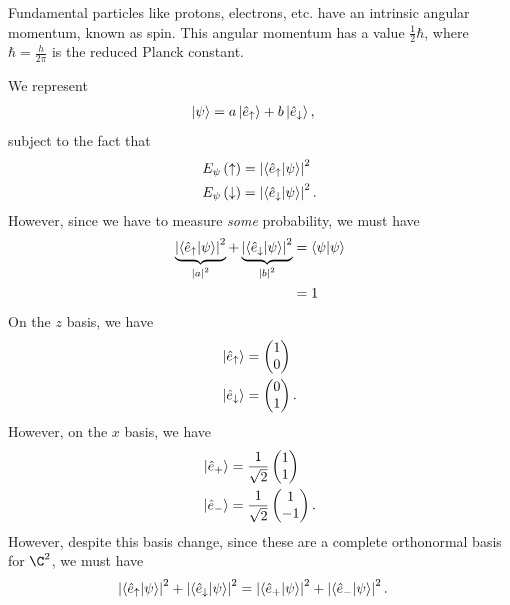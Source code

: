 \documentclass[10pt]{mypackage}
\begin{document}
\begin{example}
  Fundamental particles like protons, electrons, etc. have an intrinsic angular momentum, known as spin. This angular momentum has a value $\frac{1}{2}\hbar$, where $\hbar = \frac{h}{2\pi}$ is the reduced Planck constant.\newline

  We represent
  \begin{align*}
    \ket{\psi} &= a\ket{\hat{e}_{\uparrow}} + b\ket{\hat{e}_{\downarrow}},
  \end{align*}
  subject to the fact that
  \begin{align*}
    E_{\psi}\left(\uparrow\right) &= \left\vert \braket{\hat{e}_{\uparrow}}{\psi} \right\vert^2\\
    E_{\psi}\left(\downarrow\right) &= \left\vert \braket{\hat{e}_{\downarrow}}{\psi} \right\vert^2.
  \end{align*}
  However, since we have to measure \textit{some} probability, we must have
  \begin{align*}
    \underbrace{\left\vert \braket{\hat{e}_{\uparrow}}{\psi} \right\vert^2}_{\left\vert a \right\vert^2} + \underbrace{\left\vert \braket{\hat{e}_{\downarrow}}{\psi} \right\vert^2}_{\left\vert b \right\vert^2} &= \braket{\psi}{\psi}\\
                                                                                                                              &= 1
  \end{align*}
  On the $z$ basis, we have
  \begin{align*}
    \ket{\hat{e}_{\uparrow}} &= \begin{pmatrix}1\\0\end{pmatrix}\\
    \ket{\hat{e}_{\downarrow}} &= \begin{pmatrix}0\\1\end{pmatrix}.
  \end{align*}
  However, on the $x$ basis, we have
  \begin{align*}
    \ket{\hat{e}_{+}} &= \frac{1}{\sqrt{2}}\begin{pmatrix}1\\1\end{pmatrix}\\
    \ket{\hat{e}_{-}} &= \frac{1}{\sqrt{2}}\begin{pmatrix}1\\-1\end{pmatrix}.
  \end{align*}
  However, despite this basis change, since these are a complete orthonormal basis for $\C^2$, we must have
  \begin{align*}
    \left\vert \braket{\hat{e}_{\uparrow}}{\psi} \right\vert^2 + \left\vert \braket{\hat{e}_{\downarrow}}{\psi} \right\vert^2 &= \left\vert \braket{\hat{e}_{+}}{\psi} \right\vert^2 + \left\vert \braket{\hat{e}_{-}}{\psi} \right\vert^2.
  \end{align*}
  
\end{example}
\end{document}
